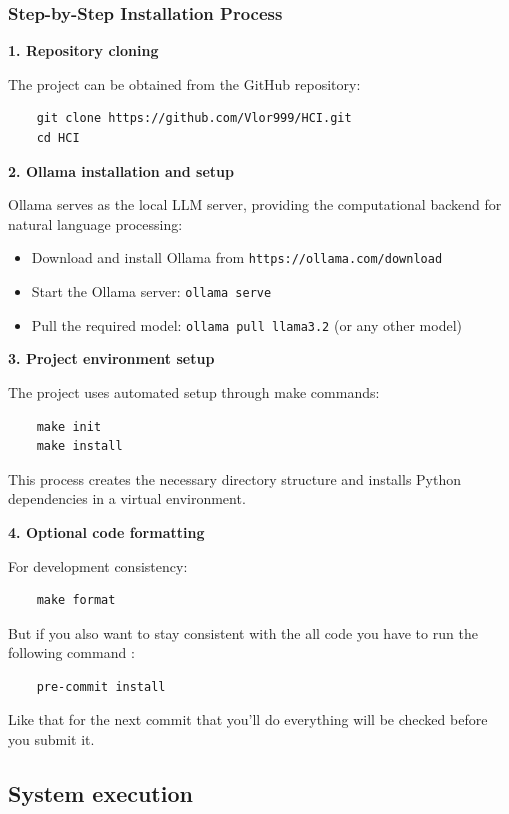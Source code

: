 \subsubsection{Step-by-Step Installation Process}

\textbf{1. Repository cloning}

The project can be obtained from the GitHub repository:

\begin{verbatim}
    git clone https://github.com/Vlor999/HCI.git
    cd HCI
\end{verbatim}

\textbf{2. Ollama installation and setup}

Ollama serves as the local LLM server, providing the computational backend for natural language processing:

\begin{itemize}
    \item Download and install Ollama from \texttt{https://ollama.com/download}
    \item Start the Ollama server: \texttt{ollama serve}
    \item Pull the required model: \texttt{ollama pull llama3.2} (or any other model)
\end{itemize}

\textbf{3. Project environment setup}

The project uses automated setup through make commands:

\begin{verbatim}
    make init
    make install
\end{verbatim}

This process creates the necessary directory structure and installs Python dependencies in a virtual environment.

\textbf{4. Optional code formatting}

For development consistency:

\begin{verbatim}
    make format
\end{verbatim}
But if you also want to stay consistent with the all code you have to run the following command :
\begin{verbatim}
    pre-commit install
\end{verbatim}
Like that for the next commit that you'll do everything will be checked before you submit it.

\subsection{System execution}

